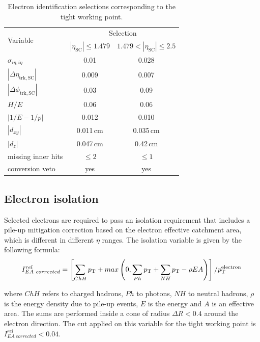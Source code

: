 \begin{table}[htb]
\caption{Electron identification selections corresponding to the tight working point.}\label{tab:tightele}
\centering
\begin{tabular}{lcc}
\toprule
\multirow{2}{*}{Variable} & \multicolumn{2}{c}{Selection}\\
 & $|\eta_\mathrm{SC}|\leq 1.479$ & $1.479 < |\eta_\mathrm{SC}| \leq 2.5$ \\
\midrule
$\sigma_{i\eta,i\eta}$ & 0.01 & 0.028 \\
$|\Delta\eta_\mathrm{trk,SC}|$ & 0.009 & 0.007 \\
$|\Delta\phi_\mathrm{trk,SC}|$ & 0.03 & 0.09 \\
$H/E$ & 0.06 & 0.06 \\
$|1/E - 1/p|$ & 0.012 & 0.010 \\
$|d_{xy}|$ & 0.011\,cm & 0.035\,cm\\
$|d_{z}|$ & 0.047\,cm & 0.42\,cm\\
missing inner hits & $\leq 2$ & $\leq 1$\\
conversion veto & yes & yes \\
\bottomrule
\end{tabular}
\end{table}

\subsection{Electron isolation}
Selected electrons are required to pass an isolation requirement that includes a pile-up mitigation correction based on the electron effective catchment area, which is different in different $\eta$ ranges. The isolation variable is given by the following formula:
\begin{equation}
I^{rel}_{EA~corrected} = \left[ \sum_{ChH}p_\mathrm{T} + max\left( 0, \sum_{Ph}p_\mathrm{T} + \sum_{NH}p_\mathrm{T} - \rho EA \right) \right]/p_\mathrm{T}^\mathrm{electron} \,
\end{equation}

where $ChH$ refers to charged hadrons, $Ph$ to photons, $NH$ to neutral hadrons, $\rho$ is the energy density due to pile-up events, $E$ is the energy and $A$ is an effective area. The sums are performed inside a cone of radius $\Delta R < 0.4$ around the electron direction. The cut applied on this variable for the tight working point is $I^{rel}_{EA~corrected} < 0.04$.

